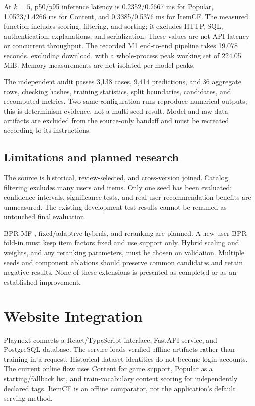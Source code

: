 \documentclass[conference,a4paper]{IEEEtran}
\begin{document}
At $k=5$, p50/p95 inference latency is 0.2352/0.2667 ms for Popular, 1.0523/1.4266 ms for Content, and 0.3385/0.5376 ms for ItemCF. The measured function includes scoring, filtering, and sorting; it excludes HTTP, SQL, authentication, explanations, and serialization. These values are not API latency or concurrent throughput. The recorded M1 end-to-end pipeline takes 19.078 seconds, excluding download, with a whole-process peak working set of 224.05 MiB. Memory measurements are not isolated per-model peaks.

The independent audit passes 3,138 cases, 9,414 predictions, and 36 aggregate rows, checking hashes, training statistics, split boundaries, candidates, and recomputed metrics. Two same-configuration runs reproduce numerical outputs; this is determinism evidence, not a multi-seed result. Model and raw-data artifacts are excluded from the source-only handoff and must be recreated according to its instructions.

\subsection{Limitations and planned research}
The source is historical, review-selected, and cross-version joined. Catalog filtering excludes many users and items. Only one seed has been evaluated; confidence intervals, significance tests, and real-user recommendation benefits are unmeasured. The existing development-test results cannot be renamed as untouched final evaluation.

BPR-MF \cite{bpr}, fixed/adaptive hybrids, and reranking are planned. A new-user BPR fold-in must keep item factors fixed and use support only. Hybrid scaling and weights, and any reranking parameters, must be chosen on validation. Multiple seeds and component ablations should preserve common candidates and retain negative results. None of these extensions is presented as completed or as an established improvement.

\section{Website Integration}
\balance
Playnext connects a React/TypeScript interface, FastAPI service, and PostgreSQL database. The service loads verified offline artifacts rather than training in a request. Historical dataset identities do not become login accounts. The current online flow uses Content for game support, Popular as a starting/fallback list, and train-vocabulary content scoring for independently declared tags. ItemCF is an offline comparator, not the application's default serving method.
\end{document}
